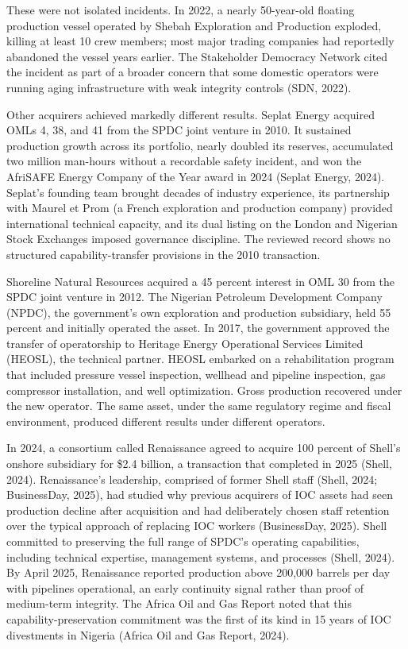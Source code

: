 These were not isolated incidents. In 2022, a nearly 50-year-old
floating production vessel operated by Shebah Exploration and Production
exploded, killing at least 10 crew members; most major trading companies
had reportedly abandoned the vessel years earlier. The Stakeholder
Democracy Network cited the incident as part of a broader concern that
some domestic operators were running aging infrastructure with weak
integrity controls (SDN, 2022).

Other acquirers achieved markedly different results. Seplat Energy
acquired OMLs 4, 38, and 41 from the SPDC joint venture in 2010. It
sustained production growth across its portfolio, nearly doubled its
reserves, accumulated two million man-hours without a recordable safety
incident, and won the AfriSAFE Energy Company of the Year award in 2024
(Seplat Energy, 2024). Seplat's founding team brought decades of
industry experience, its partnership with Maurel et Prom (a French
exploration and production company) provided international technical
capacity, and its dual listing on the London and Nigerian Stock
Exchanges imposed governance discipline. The reviewed record shows no
structured capability-transfer provisions in the 2010 transaction.

Shoreline Natural Resources acquired a 45 percent interest in OML 30
from the SPDC joint venture in 2012. The Nigerian Petroleum Development
Company (NPDC), the government's own exploration and production
subsidiary, held 55 percent and initially operated the asset. In 2017,
the government approved the transfer of operatorship to Heritage Energy
Operational Services Limited (HEOSL), the technical partner. HEOSL
embarked on a rehabilitation program that included pressure vessel
inspection, wellhead and pipeline inspection, gas compressor
installation, and well optimization. Gross production recovered under
the new operator. The same asset, under the same regulatory regime and
fiscal environment, produced different results under different
operators.

In 2024, a consortium called Renaissance agreed to acquire 100 percent
of Shell's onshore subsidiary for \$2.4 billion, a transaction that
completed in 2025 (Shell, 2024). Renaissance's leadership, comprised of
former Shell staff (Shell, 2024; BusinessDay, 2025), had studied why
previous acquirers of IOC assets had seen production decline after
acquisition and had deliberately chosen staff retention over the typical
approach of replacing IOC workers (BusinessDay, 2025). Shell committed
to preserving the full range of SPDC's operating capabilities, including
technical expertise, management systems, and processes (Shell, 2024). By
April 2025, Renaissance reported production above 200,000 barrels per
day with pipelines operational, an early continuity signal rather than
proof of medium-term integrity. The Africa Oil and Gas Report noted that
this capability-preservation commitment was the first of its kind in 15
years of IOC divestments in Nigeria (Africa Oil and Gas Report, 2024).

